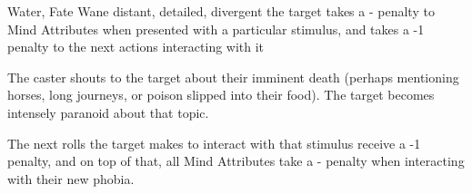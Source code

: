   {Water, Fate}%
  {Wane}%
  {distant, detailed, divergent}%
  {}%
  {the target takes a - penalty to Mind Attributes when presented with a particular stimulus, and takes a -1 penalty to the next  actions interacting with it}%
  {
    The caster shouts to the target about their imminent death (perhaps mentioning horses, long journeys, or poison slipped into their food).
    The target becomes intensely paranoid about that topic.

    The next  rolls the target makes to interact with that stimulus receive a -1 penalty, and on top of that, all Mind Attributes take a - penalty when interacting with their new phobia.
  }
